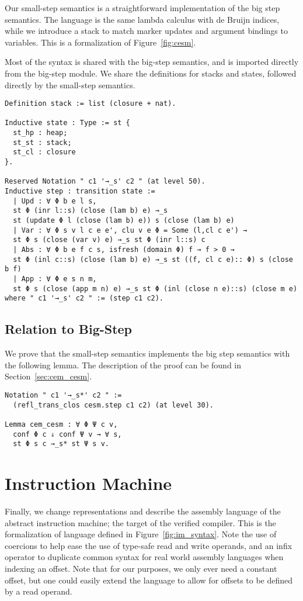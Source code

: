 Our small-step semantics is a straightforward implementation of the big step
semantics. The language is the same lambda calculus with de Bruijn indices, while
we introduce a stack to match marker updates and argument bindings to variables.
This is a formalization of Figure~\ref{fig:cesm}. 

Most of the syntax is shared with the big-step semantics, and is imported
directly from the big-step module. We share the definitions for stacks and
states, followed directly by the small-step semantics.
\begin{verbatim}
Definition stack := list (closure + nat).

Inductive state : Type := st {
  st_hp : heap; 
  st_st : stack;
  st_cl : closure
}.

Reserved Notation " c1 '→_s' c2 " (at level 50).
Inductive step : transition state :=
  | Upd : ∀ Φ b e l s, 
  st Φ (inr l::s) (close (lam b) e) →_s 
  st (update Φ l (close (lam b) e)) s (close (lam b) e)
  | Var : ∀ Φ s v l c e e', clu v e Φ = Some (l,cl c e') → 
  st Φ s (close (var v) e) →_s st Φ (inr l::s) c
  | Abs : ∀ Φ b e f c s, isfresh (domain Φ) f → f > 0 → 
  st Φ (inl c::s) (close (lam b) e) →_s st ((f, cl c e):: Φ) s (close b f)
  | App : ∀ Φ e s n m, 
  st Φ s (close (app m n) e) →_s st Φ (inl (close n e)::s) (close m e)
where " c1 '→_s' c2 " := (step c1 c2).
\end{verbatim}

\subsection{Relation to Big-Step}

We prove that the small-step semantics implements the big step semantics with
the following lemma. The description of the proof can be found in
Section~\ref{sec:cem_cesm}. 

\begin{verbatim}
Notation " c1 '→_s*' c2 " := 
  (refl_trans_clos cesm.step c1 c2) (at level 30). 

Lemma cem_cesm : ∀ Φ Ψ c v, 
  conf Φ c ⇓ conf Ψ v → ∀ s, 
  st Φ s c →_s* st Ψ s v. 
\end{verbatim}

\section{Instruction Machine} 

Finally, we change representations and describe the assembly language of the
abstract instruction machine; the target of the verified compiler. This is the
formalization of language defined in Figure~\ref{fig:im_syntax}. Note the use of
coercions to help ease the use of type-safe read and write operands, and an
infix operator to duplicate common syntax for real world assembly languages when
indexing an offset. Note that for our purposes, we only ever need a constant
offset, but one could easily extend the language to allow for offsets to be
defined by a read operand.  

